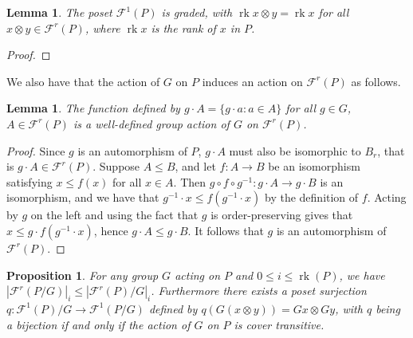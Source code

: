 \documentclass{amsart}
\newtheorem{lem}[thm]{Lemma}
\newtheorem{prop}[thm]{Proposition}
\theoremstyle{remark}
\newcommand\rk{\operatorname{rk}}
\begin{document}
\begin{lem}
The poset $\mathcal{F}^1(P)$ is graded, with $\rk{x\otimes y} = \rk{x}$ for all $x\otimes y\in \mathcal{F}^r(P)$, where $\rk{x}$ is the rank of $x$ in $P$.
\end{lem}

\begin{proof}
\end{proof}

We also have that the action of $G$ on $P$ induces an action on $\mathcal{F}^r(P)$ as follows.  

\begin{lem}\label{lem:G_action_on_FP}
The function defined by $g\cdot A = \{g\cdot a \colon a\in A\}$ for all $g\in G$, $A\in \mathcal{F}^r(P)$ is a well-defined group action of $G$ on $\mathcal{F}^r(P)$.
\end{lem}  

\begin{proof}
Since $g$ is an automorphism of $P$, $g\cdot A$ must also be isomorphic to $B_r$, that is $g\cdot A\in \mathcal{F}^r(P)$.  Suppose $A\le B$, and let $f\colon A\rightarrow B$ be an isomorphism satisfying $x\le f(x)$ for all $x\in A$.  Then $g\circ f\circ g^{-1}\colon g\cdot A \rightarrow g\cdot B$ is an isomorphism, and we have that $g^{-1}\cdot x \le f(g^{-1}\cdot x)$ by the definition of $f$.  Acting by $g$ on the left and using the fact that $g$ is order-preserving gives that $x\le g\cdot f(g^{-1}\cdot x)$, hence $g\cdot A\le g\cdot B$.  It follows that $g$ is an automorphism of $\mathcal{F}^r(P)$.
\end{proof}


\begin{prop}\label{prop:surjection_between_F_quotients}
For any group $G$ acting on $P$ and $0\le i\le \rk(P)$, we have $|\mathcal{F}^r(P/G)|_i \le |\mathcal{F}^r(P)/G|_i$. Furthermore there exists a poset surjection $q\colon \mathcal{F}^1(P)/G\rightarrow \mathcal{F}^1(P/G)$ defined by $q(G(x\otimes y)) = Gx\otimes Gy$, with $q$ being a bijection if and only if the action of $G$ on $P$ is cover transitive.
\end{prop}
\end{document}
